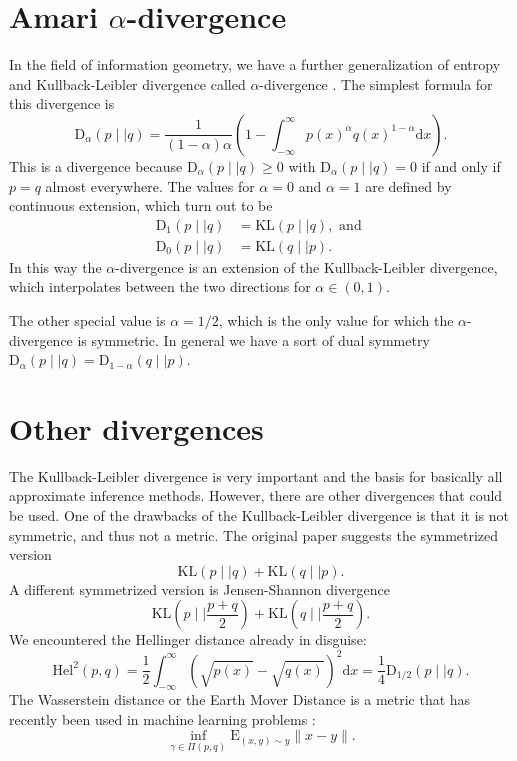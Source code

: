 \documentclass[12pt,vu]{adammath}
\newcommand\kl[2]{{\text{KL}({#1} \mid\mid {#2})}}
\newcommand\D[3]{{\text{D}_{#1}({#2} \mid\mid {#3})}}
\newcommand\Da[2]{\D{\alpha}{#1}{#2}}
\theoremstyle{plain}
\theoremstyle{definition}
\theoremstyle{remark}
\begin{document}
\section{Amari $\alpha$-divergence}\label{alphadivergence}
In the field of information geometry, we have a further generalization of entropy and Kullback-Leibler divergence called $\alpha$-divergence \cite{amari}.
The simplest formula for this divergence is \cite{zhu}
$$\Da{p}{q} = \frac{1}{(1-\alpha)\alpha}\left(1 - \int_{-\infty}^{\infty} p(x)^\alpha q(x)^{1-\alpha} \mathrm{d} x\right).$$
This is a divergence because $\Da{p}{q} \ge 0$ with $\Da{p}{q} = 0$ if and only if $p = q$ almost everywhere.
The values for $\alpha = 0$ and $\alpha = 1$ are defined by continuous extension, which turn out to be
\begin{align*}
\D{1}{p}{q} &= \kl{p}{q}, \text{ and } \\
\D{0}{p}{q} &= \kl{q}{p}.
\end{align*}
In this way the $\alpha$-divergence is an extension of the Kullback-Leibler divergence, which interpolates between the two directions for $\alpha \in (0, 1)$.

The other special value is $\alpha = 1/2$, which is the only value for which the $\alpha$-divergence is symmetric.
In general we have a sort of dual symmetry $\D{\alpha}{p}{q} = \D{1-\alpha}{q}{p}$.

\section{Other divergences}
The Kullback-Leibler divergence is very important and the basis for basically all approximate inference methods.
However, there are other divergences that could be used.
One of the drawbacks of the Kullback-Leibler divergence is that it is not symmetric, and thus not a metric.
The original paper \cite{kullback} suggests the symmetrized version
$$\kl{p}{q} + \kl{q}{p}.$$
A different symmetrized version is Jensen-Shannon divergence \cite{jsd}
$$\kl{p}{\frac{p + q}{2}} + \kl{q}{\frac{p + q}{2}}.$$
We encountered the Hellinger distance already in disguise: \cite{hellinger} \cite{zhu}
$$\text{Hel}^2(p, q) = \frac{1}{2} \int_{-\infty}^\infty \left(\sqrt{p(x)} - \sqrt{q(x)}\right)^2 \mathrm{d} x = \frac{1}{4}\D{1/2}{p}{q}.$$
The Wasserstein distance or the Earth Mover Distance is a metric that has recently been used in machine learning problems \cite{wassersteingan}:
$$\inf_{\gamma \in \Pi(p, q)} \text{E}_{(x, y) \sim y} \lVert x - y \rVert.$$
\end{document}
